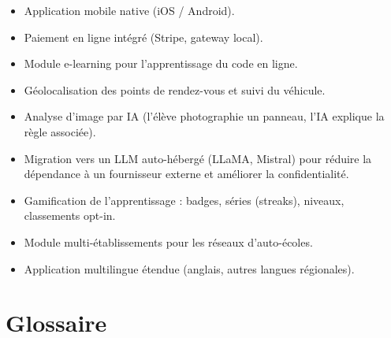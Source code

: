 \documentclass[12pt,a4paper]{article}
\begin{document}
\begin{itemize}[leftmargin=*,itemsep=4pt]
    \item Application mobile native (iOS / Android).
    \item Paiement en ligne intégré (Stripe, gateway local).
    \item Module e-learning pour l'apprentissage du code en ligne.
    \item Géolocalisation des points de rendez-vous et suivi du véhicule.
    \item Analyse d'image par IA (l'élève photographie un panneau, l'IA explique la règle associée).
    \item Migration vers un LLM auto-hébergé (LLaMA, Mistral) pour réduire la dépendance à un fournisseur externe et améliorer la confidentialité.
    \item Gamification de l'apprentissage : badges, séries (streaks), niveaux, classements opt-in.
    \item Module multi-établissements pour les réseaux d'auto-écoles.
    \item Application multilingue étendue (anglais, autres langues régionales).
\end{itemize}

\newpage

\section{Glossaire}
\end{document}
